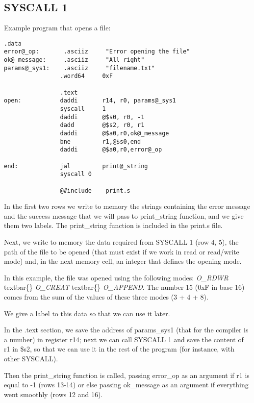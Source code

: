 \documentclass[letterpaper,10pt,english]{sphinxmanual}
\begin{document}
\subsection{SYSCALL 1}
\label{examples:syscall-1}
Example program that opens a file:

\begin{Verbatim}[commandchars=@\[\]]
                .data
error@_op:       .asciiz     "Error opening the file"
ok@_message:     .asciiz     "All right"
params@_sys1:    .asciiz     "filename.txt"
                .word64     0xF

                .text
open:           daddi       r14, r0, params@_sys1
                syscall     1
                daddi       @$s0, r0, -1
                dadd        @$s2, r0, r1
                daddi       @$a0,r0,ok@_message
                bne         r1,@$s0,end
                daddi       @$a0,r0,error@_op

end:            jal         print@_string
                syscall 0

                @#include    print.s
\end{Verbatim}

In the first two rows we write to memory the strings containing the error
message and the success message that we will pass to print\_string function, and
we give them two labels. The print\_string function is included in the print.s
file.

Next, we write to memory the data required from SYSCALL 1 (row 4, 5), the path of
the file to be opened (that must exist if we work in read or read/write mode)
and, in the next memory cell, an integer that defines the opening mode.

In this example, the file was opened using the following modes:
\emph{O\_RDWR} textbar\{\} \emph{O\_CREAT} textbar\{\} \emph{O\_APPEND}. The
number 15 (0xF in base 16) comes from the sum of the values of these three
modes (3 + 4 + 8).

We give a label to this data so that we can use it later.

In the .text section, we save the address of params\_sys1 (that for the compiler
is a number) in register r14; next we can call SYSCALL 1 and save the content of
r1 in \$s2, so that we can use it in the rest of the program (for instance, with
other SYSCALL).

Then the print\_string function is called, passing error\_op as an argument if
r1 is equal to -1 (rows 13-14) or else passing ok\_message as an argument if
everything went smoothly (rows 12 and 16).
\end{document}
